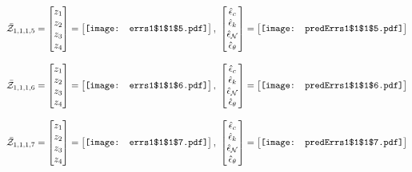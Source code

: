 \documentclass[12pt]{article}
\begin{document}
\begin{gather*}
\bar{\mathcal{Z}}_{1,1,1,5}=\begin{bmatrix}
z_1\\
z_2\\
z_3\\
z_4
 \end{bmatrix}= \begin{bmatrix}
\vcenter{\hbox{\texttt{[image: errs1\$1\$1\$5.pdf]}}}
 \end{bmatrix},\,\, \begin{bmatrix}
\hat{\epsilon}_c\\\hat{\epsilon}_k\\\hat{\epsilon}_\mathcal{N}\\\hat{\epsilon}_\theta
 \end{bmatrix}=\begin{bmatrix}
\vcenter{\hbox{\texttt{[image: predErrs1\$1\$1\$5.pdf]}}}
 \end{bmatrix}
\end{gather*}


\begin{gather*}
\bar{\mathcal{Z}}_{1,1,1,6}=\begin{bmatrix}
z_1\\
z_2\\
z_3\\
z_4
 \end{bmatrix}= \begin{bmatrix}
\vcenter{\hbox{\texttt{[image: errs1\$1\$1\$6.pdf]}}}
 \end{bmatrix},\,\, \begin{bmatrix}
\hat{\epsilon}_c\\\hat{\epsilon}_k\\\hat{\epsilon}_\mathcal{N}\\\hat{\epsilon}_\theta
 \end{bmatrix}=\begin{bmatrix}
\vcenter{\hbox{\texttt{[image: predErrs1\$1\$1\$6.pdf]}}}
 \end{bmatrix}
\end{gather*}


\begin{gather*}
\bar{\mathcal{Z}}_{1,1,1,7}=\begin{bmatrix}
z_1\\
z_2\\
z_3\\
z_4
 \end{bmatrix}= \begin{bmatrix}
\vcenter{\hbox{\texttt{[image: errs1\$1\$1\$7.pdf]}}}
 \end{bmatrix},\,\, \begin{bmatrix}
\hat{\epsilon}_c\\\hat{\epsilon}_k\\\hat{\epsilon}_\mathcal{N}\\\hat{\epsilon}_\theta
 \end{bmatrix}=\begin{bmatrix}
\vcenter{\hbox{\texttt{[image: predErrs1\$1\$1\$7.pdf]}}}
 \end{bmatrix}
\end{gather*}
\end{document}
